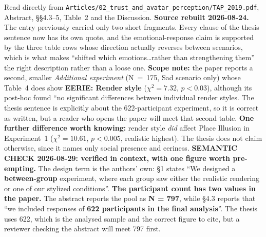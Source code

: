 \documentclass[11pt, a4paper]{article}
\begin{document}
\begin{Form}
  {Read directly from \texttt{\footnotesize Articles/02\_trust\_and\_avatar\_perception/TAP\_2019.pdf}, Abstract, \S\S4.3--5, Table~2 and the Discussion. \textbf{Source rebuilt 2026-08-24.} The entry previously carried only two short fragments. Every clause of the thesis sentence now has its own quote, and the emotional-response claim is supported by the three table rows whose direction actually reverses between scenarios, which is what makes ``shifted which emotions\ldots rather than strengthening them'' the right description rather than a loose one. \textbf{Scope note:} the paper reports a second, smaller \emph{Additional experiment} (N~=~175, Sad scenario only) whose Table~4 does show \textbf{EERIE: Render style} ($\chi^2 = 7.32$, $p < 0.03$), although its post-hoc found ``no significant differences between individual render styles. The thesis sentence is explicitly about the 622-participant experiment, so it is correct as written, but a reader who opens the paper will meet that second table. \textbf{One further difference worth knowing:} render style \emph{did} affect Place Illusion in Experiment~1 ($\chi^2 = 10.61$, $p < 0.005$, realistic highest). The thesis does not claim otherwise, since it names only social presence and eeriness. \textbf{SEMANTIC CHECK 2026-08-29: verified in context, with one figure worth pre-empting.} The design term is the authors' own: \S1 states ``We designed a \textbf{between-group} experiment, where each group saw either the realistic rendering or one of our stylized conditions''. \textbf{The participant count has two values in the paper.} The abstract reports the pool as \textbf{N = 797}, while \S4.3 reports that ``we included responses of \textbf{622 participants in the final analysis}''. The thesis uses 622, which is the analysed sample and the correct figure to cite, but a reviewer checking the abstract will meet 797 first.}



\end{Form}
\end{document}
